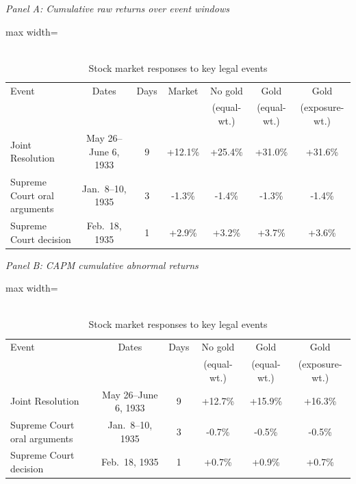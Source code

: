 \begin{table}[htbp]
\centering
\caption{\\ Stock market responses to key legal events}
\label{tab:event_study}
\small
\setlength{\tabcolsep}{4pt}
\medskip
\textit{Panel A: Cumulative raw returns over event windows}
\medskip
\begin{adjustbox}{max width=\textwidth}
\begin{tabular}{lcccccc}
\toprule
Event & Dates & Days & Market & No gold & Gold & Gold \\
 & & & & (equal-wt.) & (equal-wt.) & (exposure-wt.) \\
\midrule
Joint Resolution & May 26--June 6, 1933 & 9 & +12.1\% & +25.4\% & +31.0\% & +31.6\% \\
Supreme Court oral arguments & Jan.~8--10, 1935 & 3 & -1.3\% & -1.4\% & -1.3\% & -1.4\% \\
Supreme Court decision & Feb.~18, 1935 & 1 & +2.9\% & +3.2\% & +3.7\% & +3.6\% \\
\bottomrule
\end{tabular}
\end{adjustbox}
\medskip

\textit{Panel B: CAPM cumulative abnormal returns}
\medskip
\begin{adjustbox}{max width=\textwidth}
\begin{tabular}{lccccc}
\toprule
Event & Dates & Days & No gold & Gold & Gold \\
 & & & (equal-wt.) & (equal-wt.) & (exposure-wt.) \\
\midrule
Joint Resolution & May 26--June 6, 1933 & 9 & +12.7\% & +15.9\% & +16.3\% \\
Supreme Court oral arguments & Jan.~8--10, 1935 & 3 & -0.7\% & -0.5\% & -0.5\% \\
Supreme Court decision & Feb.~18, 1935 & 1 & +0.7\% & +0.9\% & +0.7\% \\
\bottomrule
\end{tabular}
\end{adjustbox}
\medskip


\end{table}

